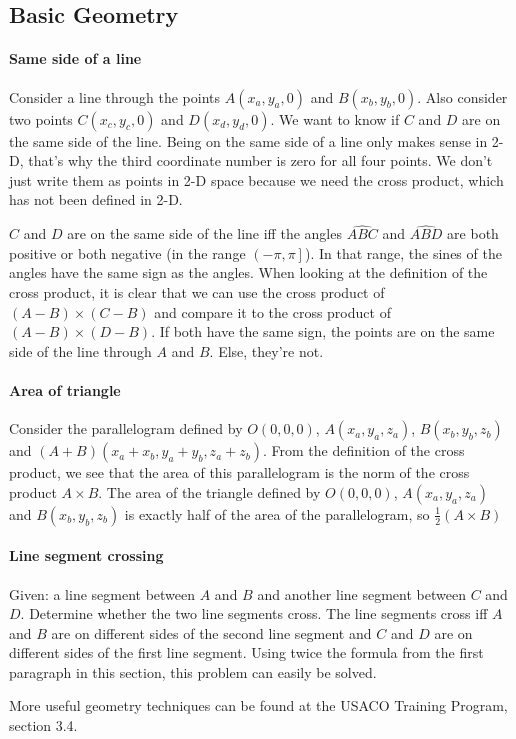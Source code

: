 \subsection{Basic Geometry}
\paragraph{Same side of a line}
Consider a line through the points $A(x_a, y_a, 0)$ and $B(x_b, y_b, 0)$.
Also consider two points $C(x_c, y_c, 0)$ and $D(x_d, y_d, 0)$. We want to know if $C$ and $D$ are on the same side of the line. 
Being on the same side of a line only makes sense in 2-D, that's why the third coordinate number is zero for all four points. 
We don't just write them as points in 2-D space because we need the cross product, which has not been defined in 2-D.

$C$ and $D$ are on the same side of the line iff the angles $\hat{ABC}$ and $\hat{ABD}$ are both positive or both negative (in the range $\left(-\pi, \pi\right]$).
In that range, the sines of the angles have the same sign as the angles.
When looking at the definition of the cross product, it is clear that we can use the cross product of $(A-B)\times(C-B)$ and compare it to the cross product of $(A-B)\times(D-B)$. 
If both have the same sign, the points are on the same side of the line through $A$ and $B$. Else, they're not.

\paragraph{Area of triangle}
Consider the parallelogram defined by $O(0,0,0)$, $A(x_a, y_a, z_a)$, $B(x_b, y_b, z_b)$ and $(A+B)(x_a+x_b, y_a+y_b, z_a+z_b)$. From the definition of the cross product, we see that the area of this parallelogram is the norm of the cross product $A \times B$.
The area of the triangle defined by $O(0,0,0)$, $A(x_a, y_a, z_a)$ and $B(x_b, y_b, z_b)$ is exactly half of the area of the parallelogram, so $\frac{1}{2} (A\times B)$

\paragraph{Line segment crossing}
Given: a line segment between $A$ and $B$ and another line segment between $C$ and $D$. Determine whether the two line segments cross.
The line segments cross iff $A$ and $B$ are on different sides of the second line segment and $C$ and $D$ are on different sides of the first line segment.
Using twice the formula from the first paragraph in this section, this problem can easily be solved.


More useful geometry techniques can be found at the USACO Training Program, section 3.4.